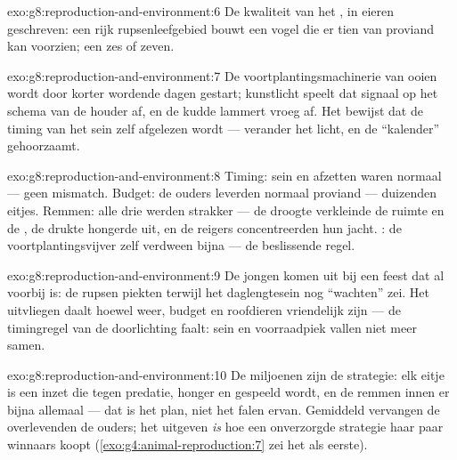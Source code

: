 \begin{solution}{exo:g8:reproduction-and-environment:6}
De kwaliteit van het , in eieren geschreven: een rijk
rupsenleefgebied bouwt een vogel die er tien van proviand kan voorzien;
een   zes of zeven.
\end{solution}

\begin{solution}{exo:g8:reproduction-and-environment:7}
De voortplantingsmachinerie van ooien wordt door korter wordende dagen
gestart; kunstlicht speelt dat signaal op het schema van de houder af, en
de kudde lammert vroeg af. Het bewijst dat de timing van het sein zelf
afgelezen wordt --- verander het licht, en de ``kalender'' gehoorzaamt.
\end{solution}

\begin{solution}{exo:g8:reproduction-and-environment:8}
Timing: sein en afzetten waren normaal --- geen mismatch. Budget: de
ouders leverden normaal proviand --- duizenden eitjes. Remmen: alle drie
werden strakker --- de droogte verkleinde de ruimte en de , de
drukte hongerde uit, en de reigers concentreerden hun jacht. :
de voortplantingsvijver zelf verdween bijna --- de beslissende regel.
\end{solution}

\begin{solution}{exo:g8:reproduction-and-environment:9}
De jongen komen uit bij een feest dat al voorbij is: de rupsen piekten
terwijl het daglengtesein nog ``wachten'' zei. Het uitvliegen daalt
hoewel weer, budget en roofdieren vriendelijk zijn --- de timingregel van
de doorlichting faalt: sein en voorraadpiek vallen niet meer samen.
\end{solution}

\begin{solution}{exo:g8:reproduction-and-environment:10}
De miljoenen zijn de strategie: elk eitje is een inzet die tegen predatie,
honger en  gespeeld wordt, en de remmen innen er bijna
allemaal --- dat is het plan, niet het falen ervan. Gemiddeld vervangen de
overlevenden de ouders; het uitgeven \emph{is} hoe een onverzorgde
strategie haar paar winnaars koopt (\cref{exo:g4:animal-reproduction:7}
zei het als eerste).
\end{solution}

